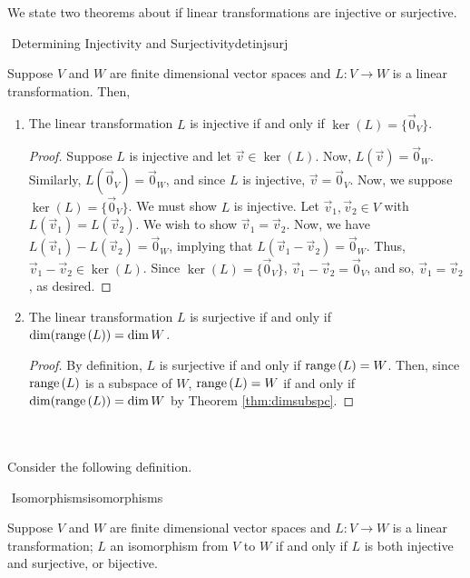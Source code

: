         We state two theorems about if linear transformations are injective or surjective.
        \begin{theorem}{\Stop\,\,Determining Injectivity and Surjectivity}{detinjsurj}

            Suppose \(V\) and \(W\) are finite dimensional vector spaces and \(L:V\to W\) is a linear transformation. Then,
            \begin{enumerate}
                \item The linear transformation \(L\) is injective if and only if \(\ker(L)=\{\vec{0}_V\}\).
                \begin{proof}
                    Suppose \(L\) is injective and let \(\vec{v}\in\ker(L)\). Now, \(L(\vec{v})=\vec{0}_W\). Similarly, \(L(\vec{0}_V)=\vec{0}_W\), and since \(L\) is injective, \(\vec{v}=\vec{0}_V\). Now, we suppose \(\ker(L)=\{\vec{0}_V\}\). We must show \(L\) is injective. Let \(\vec{v}_1,\vec{v}_2\in V\) with \(L(\vec{v}_1)=L(\vec{v}_2)\). We wish to show \(\vec{v}_1=\vec{v}_2\). Now, we have \(L(\vec{v}_1)-L(\vec{v}_2)=\vec{0}_W\), implying that \(L(\vec{v}_1-\vec{v}_2)=\vec{0}_W\). Thus, \(\vec{v}_1-\vec{v}_2\in\ker(L)\). Since \(\ker(L)=\{\vec{0}_V\}\), \(\vec{v}_1-\vec{v}_2=\vec{0}_V\), and so, \(\vec{v}_1=\vec{v}_2\), as desired.
                \end{proof}
                \item The linear transformation \(L\) is surjective if and only if \(\dim(\text{range\,}(L))=\dim W\).
                \begin{proof}
                    By definition, \(L\) is surjective if and only if \(\text{range\,}(L)=W\). Then, since \(\text{range\,}(L)\) is a subspace of \(W\), \(\text{range\,}(L)=W\) if and only if \(\dim(\text{range\,}(L))=\dim W\) by Theorem \ref{thm:dimsubspc}.
                \end{proof}
            \end{enumerate}
            
        \end{theorem}
        \vphantom
        \\
        \\
        Consider the following definition.
        \begin{definition}{\Stop\,\,Isomorphisms}{isomorphisms}

            Suppose \(V\) and \(W\) are finite dimensional vector spaces and \(L:V\to W\) is a linear transformation; \(L\) an isomorphism from \(V\) to \(W\) if and only if \(L\) is both injective and surjective, or bijective.
            
        \end{definition}
